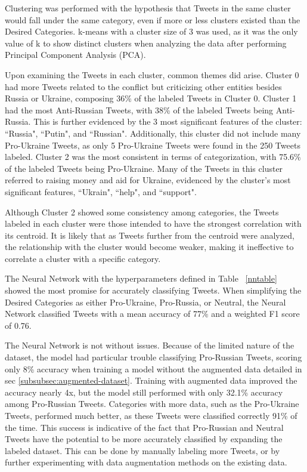 \documentclass[12pt,letterpaper,oneside,titlepage]{article}
\begin{document}
Clustering was performed with the hypothesis that Tweets in the same cluster would fall under the same category, 
even if more or less clusters existed than the Desired Categories. k-means with a cluster size of 3 was used, as it 
was the only value of k to show distinct clusters when analyzing the data after performing Principal Component 
Analysis (PCA).

Upon examining the Tweets in each cluster, common themes did arise. Cluster 0 had more Tweets 
related to the conflict but criticizing other entities besides Russia or Ukraine, composing 36\% of the labeled 
Tweets in Cluster 0. Cluster 1 had the most Anti-Russian Tweets, with 38\% of the labeled Tweets being Anti-Russia. 
This is further evidenced by the 3 most significant 
features of the cluster: ``Russia", ``Putin", and ``Russian". Additionally, this cluster did not include many 
Pro-Ukraine Tweets, as only 5 Pro-Ukraine Tweets were found in the 250 Tweets labeled. 
Cluster 2 was the most consistent in terms of categorization, with 75.6\% of the labeled Tweets being Pro-Ukraine. Many 
of the Tweets in this cluster referred to raising money and aid for Ukraine, evidenced by the cluster's most 
significant features, ``Ukrain", ``help", and ``support".

Although Cluster 2 showed some consistency among categories, the Tweets labeled in each cluster 
were those intended to have the strongest correlation with its centroid. It is likely that as Tweets further from 
the centroid were analyzed, the relationship with the cluster would become weaker, making it ineffective to correlate 
a cluster with a specific category.

The Neural Network with the hyperparameters defined in Table ~\ref{nntable} showed the most promise for accurately classifying Tweets.
When simplifying the Desired Categories
as either Pro-Ukraine, Pro-Russia, or Neutral, the Neural Network classified Tweets with a mean accuracy of 77\% and a 
weighted F1 score of 0.76. 

The Neural Network is not without issues. Because of the limited nature of the dataset, the model had particular 
trouble classifying Pro-Russian Tweets, scoring only 8\% accuracy when training a model without the augmented 
data detailed in sec \ref{subsubsec:augmented-dataset}. Training with augmented data improved the accuracy 
nearly 4x, but the model still performed with only 32.1\% accuracy among Pro-Russian Tweets. Categories with more 
data, such as the Pro-Ukraine Tweets, performed much better, as these Tweets were classified correctly 91\% of the time. 
This success is indicative of the fact that Pro-Russian and Neutral Tweets have the potential to be more accurately classified 
by expanding the labeled dataset. This can be done by manually labeling more Tweets, or by further experimenting with data augmentation methods on the existing data.
\end{document}
